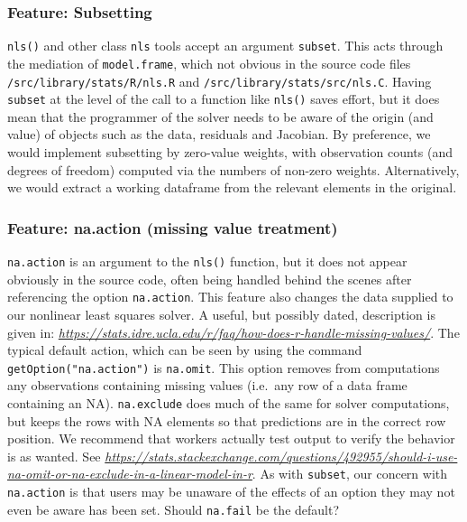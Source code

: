 \hypertarget{feature-subsetting}{%
\subsubsection{Feature: Subsetting}\label{feature-subsetting}}

\texttt{nls()} and other class \texttt{nls} tools accept an argument \texttt{subset}. This acts through
the mediation of \texttt{model.frame}, which not obvious in the
source code files \texttt{/src/library/stats/R/nls.R} and \texttt{/src/library/stats/src/nls.C}.
Having \texttt{subset} at the level of the call to a function like
\texttt{nls()} saves effort, but it does mean that the programmer of the
solver needs to be aware of the
origin (and value) of objects such as the data, residuals and Jacobian.
By preference,
we would implement subsetting by zero-value weights, with observation counts
(and degrees of freedom) computed via the numbers of non-zero weights. Alternatively,
we would extract a working dataframe from the relevant elements in the original.

\hypertarget{feature-na.action-missing-value-treatment}{%
\subsubsection{Feature: na.action (missing value treatment)}\label{feature-na.action-missing-value-treatment}}

\texttt{na.action} is an argument to the \texttt{nls()} function, but it does not appear
obviously in the source code, often being handled behind the scenes after
referencing the option \texttt{na.action}. This feature also changes the data
supplied to our nonlinear least squares solver.
A useful, but possibly dated, description is given in:
\emph{\url{https://stats.idre.ucla.edu/r/faq/how-does-r-handle-missing-values/}}.
The typical default action, which can be seen by using the command
\texttt{getOption("na.action")}
is \texttt{na.omit}. This option removes from computations any observations
containing missing values (i.e.~any row of a data frame containing an NA).
\texttt{na.exclude} does much of the same for solver computations, but keeps the rows with
NA elements so that predictions are in the correct row position. We recommend that
workers actually test output to verify the behavior is as wanted.
See \emph{\url{https://stats.stackexchange.com/questions/492955/should-i-use-na-omit-or-na-exclude-in-a-linear-model-in-r}}.
As with \texttt{subset}, our concern with \texttt{na.action} is that users may be unaware of the
effects of an option they may not even be aware has been set. Should \texttt{na.fail} be the default?

